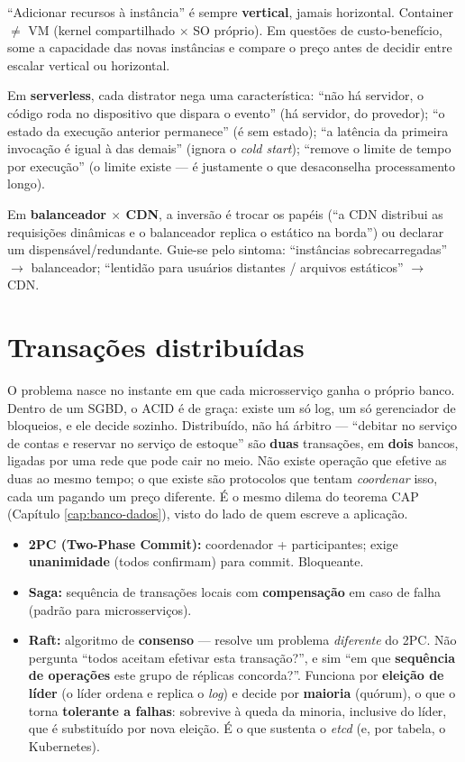 \begin{pegadinha}
``Adicionar recursos à instância'' é sempre \textbf{vertical}, jamais
horizontal. Container $\neq$ VM (kernel compartilhado $\times$ SO próprio). Em
questões de custo-benefício, some a capacidade das novas instâncias e compare
o preço antes de decidir entre escalar vertical ou horizontal.

Em \textbf{serverless}, cada distrator nega uma característica: ``não há
servidor, o código roda no dispositivo que dispara o evento'' (há servidor, do
provedor); ``o estado da execução anterior permanece'' (é sem estado); ``a
latência da primeira invocação é igual à das demais'' (ignora o \emph{cold
start}); ``remove o limite de tempo por execução'' (o limite existe --- é
justamente o que desaconselha processamento longo).

Em \textbf{balanceador $\times$ CDN}, a inversão é trocar os papéis (``a CDN
distribui as requisições dinâmicas e o balanceador replica o estático na
borda'') ou declarar um dispensável/redundante. Guie-se pelo sintoma:
``instâncias sobrecarregadas'' $\to$ balanceador; ``lentidão para usuários
distantes / arquivos estáticos'' $\to$ CDN.
\end{pegadinha}

\section{Transações distribuídas}

O problema nasce no instante em que cada microsserviço ganha o próprio banco.
Dentro de um SGBD, o ACID é de graça: existe um só log, um só gerenciador de
bloqueios, e ele decide sozinho. Distribuído, não há árbitro --- ``debitar no
serviço de contas e reservar no serviço de estoque'' são \textbf{duas}
transações, em \textbf{dois} bancos, ligadas por uma rede que pode cair no
meio. Não existe operação que efetive as duas ao mesmo tempo; o que existe são
protocolos que tentam \emph{coordenar} isso, cada um pagando um preço
diferente. É o mesmo dilema do teorema CAP (Capítulo \ref{cap:banco-dados}),
visto do lado de quem escreve a aplicação.

\begin{itemize}
\item \textbf{2PC (Two-Phase Commit):} coordenador + participantes; exige
\textbf{unanimidade} (todos confirmam) para commit. Bloqueante.
\item \textbf{Saga:} sequência de transações locais com \textbf{compensação}
em caso de falha (padrão para microsserviços).
\item \textbf{Raft:} algoritmo de \textbf{consenso} --- resolve um problema
\emph{diferente} do 2PC. Não pergunta ``todos aceitam efetivar esta
transação?'', e sim ``em que \textbf{sequência de operações} este grupo de
réplicas concorda?''. Funciona por \textbf{eleição de líder} (o líder
ordena e replica o \emph{log}) e decide por \textbf{maioria} (quórum), o que o
torna \textbf{tolerante a falhas}: sobrevive à queda da minoria, inclusive do
líder, que é substituído por nova eleição. É o que sustenta o \emph{etcd} (e,
por tabela, o Kubernetes).
\end{itemize}

